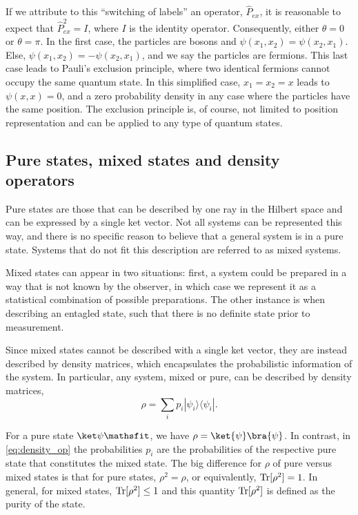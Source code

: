 If we attribute to this ``switching of labels'' an operator, $\hat{P}_{ex}$, it is reasonable to expect that $\hat{P}_{ex}^2 = I$, where $I$ is the identity operator. Consequently, either $\theta = 0$ or $\theta = \pi$. In the first case, the particles are bosons and $\psi(x_1, x_2) = \psi(x_2, x_1)$. Else, $\psi(x_1, x_2) = -\psi(x_2, x_1)$, and we say the particles are fermions. This last case leads to Pauli's exclusion principle, where two identical fermions cannot occupy the same quantum state. In this simplified case, $x_1=x_2=x$ leads to $\psi(x,x) = 0$, and a zero probability density in any case where the particles have the same position. The exclusion principle is, of course, not limited to position representation and can be applied to any type of quantum states.


\subsection{Pure states, mixed states and density operators}\label{sec:pure_and_mixed_states}
Pure states are those that can be described by one ray in the Hilbert space and can be expressed by a single ket vector. Not all systems can be represented this way, and there is no specific reason to believe that a general system is in a pure state. Systems that do not fit this description are referred to as mixed systems.

Mixed states can appear in two situations: first, a system could be prepared in a way that is not known by the observer, in which case we represent it as a statistical combination of possible preparations. The other instance is when describing an entagled state, such that there is no definite state prior to measurement. 

Since mixed states cannot be described with a single ket vector, they are instead described by density matrices, which encapsulates the probabilistic information of the system. In particular, any system, mixed or pure, can be described by density matrices,
\begin{equation}
    \rho = \sum_i p_i |\psi_i\rangle \langle \psi_i|.
    \label{eq:density_op}
\end{equation}


For a pure state $\ketpsi{}$, we have $\rho = \ket{\psi}\bra{\psi}$. In contrast, in \eqref{eq:density_op} the probabilities $p_i$ are the probabilities of the respective pure state that constitutes the mixed state. The big difference for $\rho$ of pure versus mixed states is that for pure states, $\rho^2 = \rho$, or equivalently, $\text{Tr}[\rho^2] = 1$. In general, for mixed states, $\text{Tr}[\rho^2] \le 1 $ and this quantity $\text{Tr}[\rho^2]$ is defined as the purity of the state.

